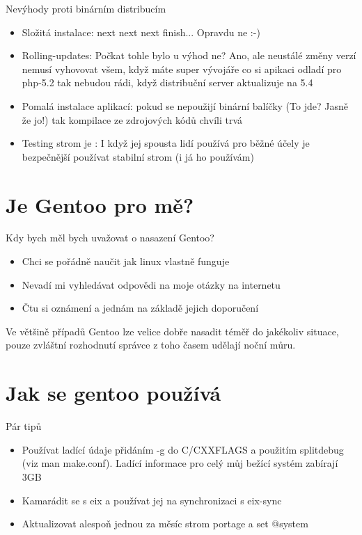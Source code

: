 \documentclass{beamer}
\begin{document}
\begin{frame}{Nevýhody proti binárním distribucím}
	\begin{itemize}
		\item Složitá instalace: next next next finish... Opravdu ne :-)
		\item Rolling-updates: Počkat tohle bylo u výhod ne? Ano, ale neustálé změny verzí nemusí vyhovovat všem, když máte super vývojáře co si apikaci odladí pro php-5.2 tak nebudou rádi, když distribuční server aktualizuje na 5.4
		\item Pomalá instalace aplikací: pokud se nepoužijí binární balíčky (To jde? Jasně že jo!) tak kompilace ze zdrojových kódů chvíli trvá
		\item Testing strom je : I když jej spousta lidí používá pro běžné účely je bezpečnější používat stabilní strom (i já ho používám)
	\end{itemize}
\end{frame}

\section{Je Gentoo pro mě?}
\begin{frame}{Kdy bych měl bych uvažovat o nasazení Gentoo?}
	\begin{itemize}
		\item Chci se pořádně naučit jak linux vlastně funguje
		\item Nevadí mi vyhledávat odpovědi na moje otázky na internetu
		\item Čtu si oznámení a jednám na základě jejich doporučení
	\end{itemize}
	Ve většině případů Gentoo lze velice dobře nasadit téměř do jakékoliv situace, pouze zvláštní rozhodnutí správce z toho časem udělají noční můru.
\end{frame}

\section{Jak se gentoo používá}
\begin{frame}{Pár tipů}
	\begin{itemize}
		\item Používat ladící údaje přidáním -g do C/CXXFLAGS a použitím splitdebug (viz man make.conf). Ladící informace pro celý můj bežící systém zabírají 3GB
		\item Kamarádit se s eix a používat jej na synchronizaci s eix-sync
		\item Aktualizovat alespoň jednou za měsíc strom portage a set @system 
	\end{itemize}
\end{frame}
\end{document}
